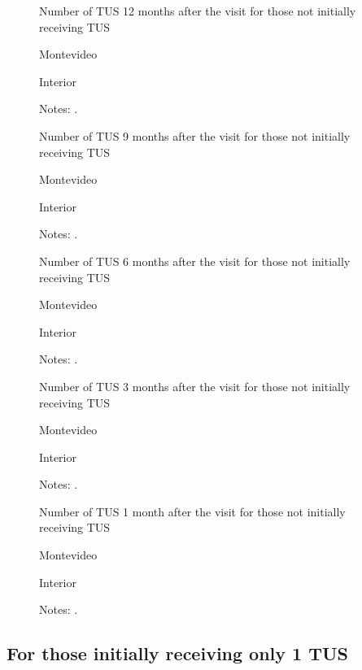 \documentclass[12pt]{article}
\begin{document}
\begin{figure}[H]%
	\caption{Number of TUS 12 months after the visit for those not initially receiving TUS}%
	\centering
	\caption*{ {Montevideo}}
	\qquad
	\caption*{Interior}
	\label{fig:first_stage_noTus_tus12}%
	\caption*{ {\footnotesize Notes: .}}
\end{figure}

\begin{figure}[H]%
	\caption{Number of TUS 9 months after the visit for those not initially receiving TUS}%
	\centering
	\caption*{ {Montevideo}}
	\qquad
	\caption*{Interior}
	\label{fig:first_stage_noTus_tus9}%
	\caption*{ {\footnotesize Notes: .}}
\end{figure}

\begin{figure}[H]%
	\caption{Number of TUS 6 months after the visit for those not initially receiving TUS}%
	\centering
	\caption*{ {Montevideo}}
	\qquad
	\caption*{Interior}
	\label{fig:first_stage_noTus_tus6}%
	\caption*{ {\footnotesize Notes: .}}
\end{figure}

\begin{figure}[H]%
	\caption{Number of TUS 3 months after the visit for those not initially receiving TUS}%
	\centering
	\caption*{ {Montevideo}}
	\qquad
	\caption*{Interior}
	\label{fig:first_stage_noTus_tus3}%
	\caption*{ {\footnotesize Notes: .}}
\end{figure}

\begin{figure}[H]%
	\caption{Number of TUS 1 month after the visit for those not initially receiving TUS}%
	\centering
	\caption*{ {Montevideo}}
	\qquad
	\caption*{Interior}
	\label{fig:first_stage_noTus_tus1}%
	\caption*{ {\footnotesize Notes: .}}
\end{figure}

\subsection{For those initially receiving only 1 TUS}
\end{document}
